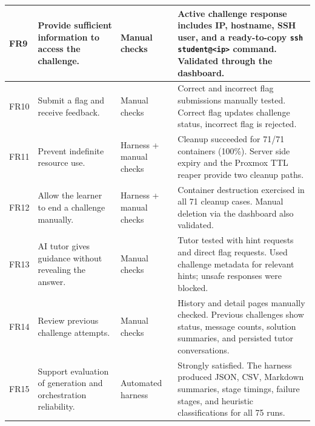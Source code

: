 \begin{longtable}{|p{}|p{}|p{}|p{}|}
	\hline
	FR9         & Provide sufficient information to access the challenge.         & Manual checks           & Active challenge response includes IP, hostname, SSH user, and a ready-to-copy \lstinline{ssh student@<ip>} command. Validated through the dashboard.                                                  \\
	\hline
	FR10        & Submit a flag and receive feedback.                             & Manual checks           & Correct and incorrect flag submissions manually tested. Correct flag updates challenge status, incorrect flag is rejected.                                                                             \\
	\hline
	FR11        & Prevent indefinite resource use.                                & Harness + manual checks & Cleanup succeeded for 71/71 containers (100\%). Server side expiry and the Proxmox TTL reaper provide two cleanup paths.                                                                               \\
	\hline
	FR12        & Allow the learner to end a challenge manually.                  & Harness + manual checks & Container destruction exercised in all 71 cleanup cases. Manual deletion via the dashboard also validated.                                                                                             \\
	\hline
	FR13        & AI tutor gives guidance without revealing the answer.           & Manual checks           & Tutor tested with hint requests and direct flag requests. Used challenge metadata for relevant hints; unsafe responses were blocked.                                                                   \\
	\hline
	FR14        & Review previous challenge attempts.                             & Manual checks           & History and detail pages manually checked. Previous challenges show status, message counts, solution summaries, and persisted tutor conversations.                                                     \\
	\hline
	FR15        & Support evaluation of generation and orchestration reliability. & Automated harness       & Strongly satisfied. The harness produced JSON, CSV, Markdown summaries, stage timings, failure stages, and heuristic classifications for all 75 runs.                                                  \\
	\hline
\end{longtable}


